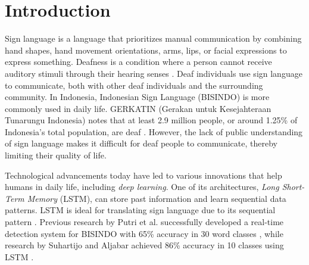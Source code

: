 \section{Introduction}
\label{sec:introduction}




Sign language is a language that prioritizes manual communication by combining hand shapes, hand movement orientations, arms, lips, or facial expressions to express something. Deafness is a condition where a person cannot receive auditory stimuli through their hearing senses \cite{maulida2017}. Deaf individuals use sign language to communicate, both with other deaf individuals and the surrounding community. In Indonesia, Indonesian Sign Language (BISINDO) is more commonly used in daily life. GERKATIN (Gerakan untuk Kesejahteraan Tunarungu Indonesia) notes that at least 2.9 million people, or around 1.25\% of Indonesia's total population, are deaf \cite{evitasari2015}. However, the lack of public understanding of sign language makes it difficult for deaf people to communicate, thereby limiting their quality of life.

Technological advancements today have led to various innovations that help humans in daily life, including \emph{deep learning}. One of its architectures, \emph{Long Short-Term Memory} (LSTM), can store past information and learn sequential data patterns. LSTM is ideal for translating sign language due to its sequential pattern \cite{sadli2020}. Previous research by Putri et al. successfully developed a real-time detection system for BISINDO with 65\% accuracy in 30 word classes \cite{putri2022}, while research by Suhartijo and Aljabar achieved 86\% accuracy in 10 classes using LSTM \cite{aljabar2020}.

